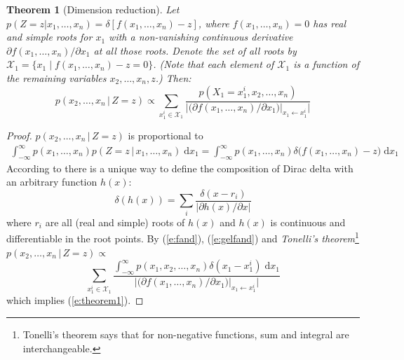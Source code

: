 \documentclass{article} %
\newtheorem{theorem}{Theorem}
\newcommand{\pr}{p}
\newcommand{\dd}{\;\mathrm{d}} %
\begin{document}
\begin{theorem}[Dimension reduction] 
\label{theorem1}
Let {\footnotesize $\pr(Z\!=\!z | x_1, \ldots, x_n) = \delta[f(x_1, \ldots, x_n)-z]$}, 
where $f(x_1, \ldots, x_n) = 0$ has real and simple roots for $x_1$ with a non-vanishing continuous derivative
$\partial f(x_1, \ldots, x_n) / \partial x_1$ at all those roots.
Denote the set of all roots by 
 $ \mathcal{X}_1 = \{ x_1 \; | \; f(x_1, \ldots, x_n) - z = 0 \} $. 
(Note that each element of $ \mathcal{X}_1 $
 is a function of the remaining variables $ x_2,\dots,x_n,z $.)
 Then:
\begin{equation}%
\label{e:theorem1}
p(x_2, \ldots, x_n \,|\, Z=z) \propto 
\sum_{x_1^i \in \mathcal{X}_1} 
\frac{p(X_1=x_1^i, x_2, \ldots, x_n)}
{\Big|\big(\partial f(x_1, \ldots, x_n) / \partial x_1 \big)|_{x_1 \leftarrow x_1^i} \Big|}
\end{equation}
\end{theorem}
\begin{proof}
$p(x_2, \ldots, x_n \,|\, Z=z)$ is proportional to
\begin{align}
\int_{-\infty}^{\infty}p(x_1, \ldots, x_n)p(Z=z \,|\, x_1, \ldots, x_n) \dd x_1 %
%
=\int_{-\infty}^{\infty}p(x_1, \ldots, x_n)
\delta \big( f(x_1, \ldots, x_n) - z \big) \dd x_1 
\label{e:fand}
\end{align}
According to \cite{gel1964generalized}
there is a unique way to define the composition of Dirac delta with 
an arbitrary function $h(x)$:
\begin{equation}
\label{e:gelfand}
\delta(h(x)) = \sum_{i} \frac{\delta(x - r_i)}{|\partial h(x)/\partial x|}
\end{equation}
where $r_i$ are all (real and simple) roots of $h(x)$ and $h(x)$ is continuous and differentiable in the root points. By (\ref{e:fand}), (\ref{e:gelfand})  and 
\emph{Tonelli's theorem}\footnote{Tonelli's theorem says that for non-negative functions, sum and integral are interchangeable.} 
$\pr(x_2, \ldots, x_n \,|\, Z = z) \propto$
\begin{equation*}%
\sum_{x_1^i \in \mathcal{X}_1} 
\frac{\int_{-\infty}^{\infty} p(x_1, x_2, \ldots, x_n)  \delta(x_1 - x_1^i) \dd x_1}
{\Big|\big(\partial f(x_1, \ldots, x_n) / \partial x_1 \big)|_{x_1 \leftarrow x_1^i} \Big|}
\end{equation*}
which implies (\ref{e:theorem1}).
\end{proof}
%
\end{document}
